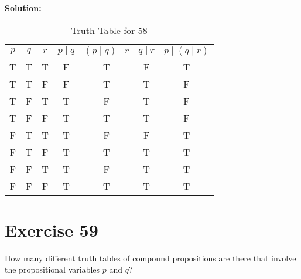 \documentclass{Axon}
\begin{document}
\noindent
\textbf{Solution:}
\begin{table}[ht]
\centering
\begin{tabular}{c|c|c|c|c|c|c}
    \(p\) & \(q\) & \(r\) & \(p \mathbin{\mid} q\) & \(\left( p \mathbin{\mid} q\right) \mathbin{\mid} r\) & \(q \mathbin{\mid} r\) & \(p \mathbin{\mid} \left(q \mathbin{\mid} r\right) \)\\
    T     & T     & T     & F                      & T                                                     & F                      & T                                                    \\
    T     & T     & F     & F                      & T                                                     & T                      & F                                                    \\
    T     & F     & T     & T                      & F                                                     & T                      & F                                                    \\
    T     & F     & F     & T                      & T                                                     & T                      & F                                                    \\
    F     & T     & T     & T                      & F                                                     & F                      & T                                                    \\
    F     & T     & F     & T                      & T                                                     & T                      & T                                                    \\
    F     & F     & T     & T                      & F                                                     & T                      & T                                                    \\
    F     & F     & F     & T                      & T                                                     & T                      & T
\end{tabular}
\caption{Truth Table for 58}
\end{table}

\section*{Exercise 59}
How many different truth tables of compound propositions are there that involve the propositional variables \(p\) and \(q\)?
\end{document}
